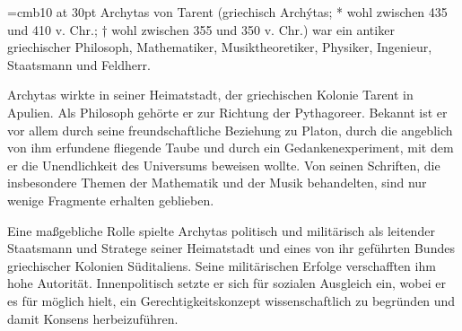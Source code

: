 
\font\Large=cmb10 at 30pt
\Large
Archytas von Tarent (griechisch Archýtas; * wohl zwischen 435
und 410 v. Chr.; † wohl zwischen 355 und 350 v. Chr.) war ein antiker
griechischer Philosoph, Mathematiker, Musiktheoretiker, Physiker,
Ingenieur, Staatsmann und Feldherr.

Archytas wirkte in seiner Heimatstadt, der griechischen Kolonie Tarent
in Apulien. Als Philosoph gehörte er zur Richtung der Pythagoreer.
Bekannt ist er vor allem durch seine freundschaftliche Beziehung zu
Platon, durch die angeblich von ihm erfundene fliegende Taube und durch
ein Gedankenexperiment, mit dem er die Unendlichkeit des Universums
beweisen wollte. Von seinen Schriften, die insbesondere Themen der
Mathematik und der Musik behandelten, sind nur wenige Fragmente erhalten
geblieben.

Eine maßgebliche Rolle spielte Archytas politisch und militärisch als
leitender Staatsmann und Stratege seiner Heimatstadt und eines von ihr
geführten Bundes griechischer Kolonien Süditaliens. Seine militärischen
Erfolge verschafften ihm hohe Autorität. Innenpolitisch setzte er sich
für sozialen Ausgleich ein, wobei er es für möglich hielt, ein
Gerechtigkeitskonzept wissenschaftlich zu begründen und damit Konsens
herbeizuführen.
\bye
